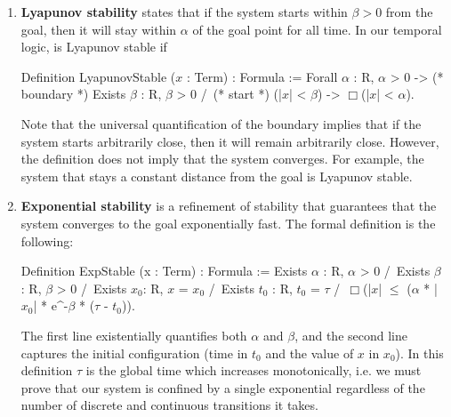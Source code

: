 \documentclass[preprint,nocopyrightspace]{sigplanconf}
\begin{document}
\begin{enumerate}
\item \textbf{Lyapunov stability} states that if the system starts within $\beta > 0$ from the goal, then it will stay within $\alpha$ of the goal point for all time.
In our temporal logic,  is Lyapunov stable if
\begin{coq}
Definition LyapunovStable ($x$ : Term) : Formula :=
  Forall $\alpha$ : R, $\alpha$ > 0 -> (* boundary *)
    Exists $\beta$ : R, $\beta$ > 0 /\ (* start *)
      (|$x$| < $\beta$) -> $\Box$(|$x$| < $\alpha$).
\end{coq}
Note that the universal quantification of the boundary implies that if the system starts arbitrarily close, then it will remain arbitrarily close.
However, the definition does not imply that the system converges.
For example, the system that stays a constant distance from the goal is Lyapunov stable.


\item \textbf{Exponential stability} is a refinement of stability that guarantees that the system converges to the goal exponentially fast.
The formal definition is the following:
\begin{coq}
Definition ExpStable (x : Term) : Formula :=
  Exists $\alpha$ : R, $\alpha$ > 0 /\ Exists $\beta$ : R, $\beta$ > 0 /\
  Exists $x_0$: R, $x$ = $x_0$ /\ Exists $t_0$ : R, $t_0$ = $\tau$ /\
     $\Box$(|$x$| $\leq$ ($\alpha$ * |$x_0$| * e^{-$\beta$ * ($\tau$ - $t_0$)}).
\end{coq}
The first line existentially quantifies both $\alpha$ and $\beta$, and the second line captures the initial configuration (time in $t_0$ and the value of $x$ in $x_0$).
In this definition $\tau$ is the global time which increases monotonically, i.e. we must prove that our system is confined by a single exponential regardless of the number of discrete and continuous transitions it takes.

\end{enumerate}

\end{document}
